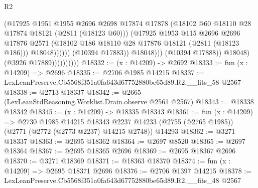 \begin{lexlean}{R2}
\begin{coremodule}
                                          (@17925
                                            @1951
                                            @1955
                                            @2696
                                            @2698
                                            @17874
                                            @17878
                                            (@18102
                                              @60
                                              @18110
                                              @28
                                              @17874
                                              @18121
                                              (@2811 (@18123 @60)))
                                            (@17925
                                              @1953
                                              @115
                                              @2696
                                              @2696
                                              @17876
                                              @2571
                                              (@18102
                                                @186
                                                @18110
                                                @28
                                                @17876
                                                @18121
                                                (@2811 (@18123 @186)))
                                              @18048))))))
                                  (@10394 @17883))
                                @18048)))
                          (@10394 @17888))
                        @18048)
                      (@3926 @17889))))))))))
@18332 := (x : @14209) -> @2692
@18333 := fun (x : @14209) => @2696
@18335 := @2706 @1985 @14215
@18337 := LexLeanPreserve.Cb5568f351a0fa643d67752880be65d89.R2.__fits_58 @2567
@18338 := @2713 @18337
@18342 := @2665 (LexLeanStdReasoning.Worklist.Drain.observe @2561 @2567)
@18343 := @18338 @18342
@18345 := (x : @14209) -> @18335 @18343
@18361 := fun (x : @14209) =>
  @2730
    @1985
    @14215
    @18343
    @2237
    @14233
    (@2755 (@2765 @1985))
    (@2771 (@2772 (@2773 @2237) @14215 @2748))
    @14293
@18362 := @3271 @18337
@18363 := @2695 @18362
@18364 := @2697 @8520
@18365 := @2697 @18364
@18367 := @2695 @18365 @2696
@18369 := @2695 @18367 @2696
@18370 := @3271 @18369
@18371 := @18363 @18370
@18374 := fun (x : @14209) => @2695 @18371 @2696
@18376 := @2706 @1397 @14215
@18378 := LexLeanPreserve.Cb5568f351a0fa643d67752880be65d89.R2.__fits_48 @2567

\end{coremodule}
\end{lexlean}
